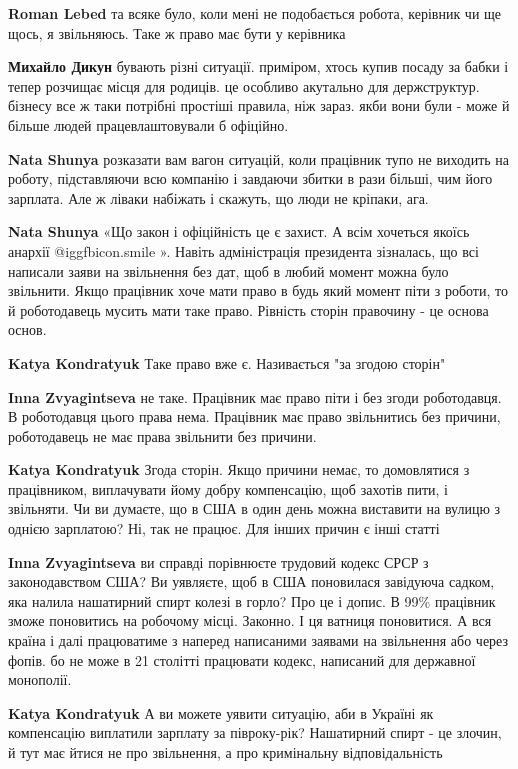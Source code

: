 \begin{itemize}
\begin{itemize}
\textbf{Roman Lebed} та всяке було, коли мені не подобається робота, керівник чи ще щось, я звільняюсь. Таке ж право має бути у керівника

\textbf{Михайло Дикун} бувають різні ситуації. приміром, хтось купив посаду за
бабки і тепер розчищає місця для родиців. це особливо акутально для
держструктур. бізнесу все ж таки потрібні простіші правила, ніж зараз. якби
вони були - може й більше людей працевлаштовували б офіційно.

\textbf{Nata Shunya} розказати вам вагон ситуацій, коли працівник тупо не виходить на роботу, підставляючи всю компанію і завдаючи збитки в рази більші, чим його зарплата. Але ж ліваки набіжать і скажуть, що люди не кріпаки, ага.

\textbf{Nata Shunya} «Що закон і офіційність це є захист. А всім хочеться якоїсь анархії  @igg{fbicon.smile} ». Навіть адміністрація президента зізналась, що всі написали заяви на звільнення без дат, щоб в любий момент можна було звільнити. Якщо працівник хоче мати право в будь який момент піти з роботи, то й роботодавець мусить мати таке право. Рівність сторін правочину - це основа основ.

\textbf{Katya Kondratyuk} Таке право вже є. Називається "за згодою сторін"

\textbf{Inna Zvyagintseva} не таке. Працівник має право піти і без згоди роботодавця. В роботодавця цього права нема. Працівник має право звільнитись без причини, роботодавець не має права звільнити без причини.

\textbf{Katya Kondratyuk} Згода сторін. Якщо причини немає, то домовлятися з працівником, виплачувати йому добру компенсацію, щоб захотів пити, і звільняти. Чи ви думаєте, що в США в один день можна виставити на вулицю з однією зарплатою? Ні, так не працює. Для інших причин є інші статті

\textbf{Inna Zvyagintseva} ви справді порівнюєте трудовий кодекс СРСР з
законодавством США? Ви уявляєте, щоб в США поновилася завідуюча садком, яка
налила нашатирний спирт колезі в горло? Про це і допис. В 99\% працівник зможе
поновитись на робочому місці. Законно. І ця ватниця поновитися. А вся країна і
далі працюватиме з наперед написаними заявами на звільнення або через фопів. бо
не може в 21 столітті працювати кодекс, написаний для державної монополії.

\textbf{Katya Kondratyuk} А ви можете уявити ситуацію, аби в Україні як компенсацію виплатили зарплату за півроку-рік? Нашатирний спирт - це злочин, й тут має йтися не про звільнення, а про кримінальну відповідальність


\end{itemize}
\end{itemize}
